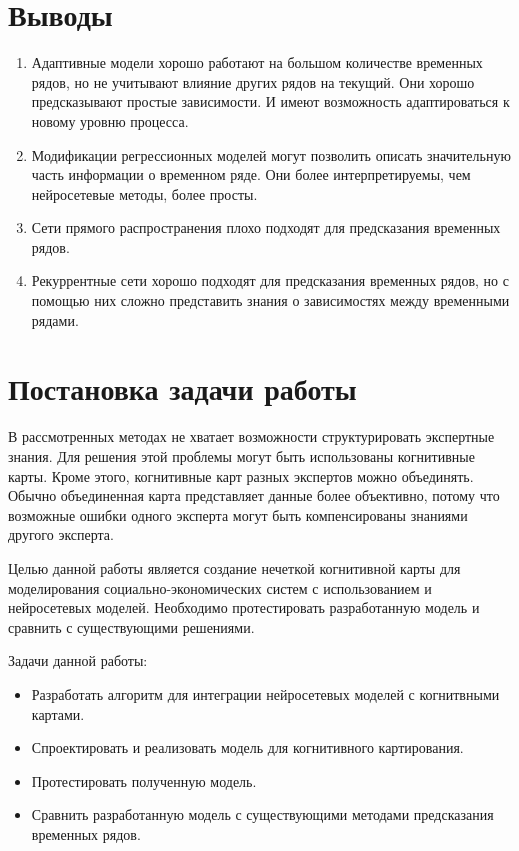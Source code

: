 \section{Выводы}

\begin{enumerate}
	\item Адаптивные модели хорошо работают на большом количестве временных рядов,
	но не учитывают влияние других рядов на текущий. Они хорошо предсказывают простые зависимости.
	И имеют возможность адаптироваться к новому уровню процесса.
	\item Модификации регрессионных моделей могут позволить описать значительную
	часть информации о временном ряде. Они более интерпретируемы, чем нейросетевые методы, более просты.
	\item Сети прямого распространения плохо подходят для предсказания временных рядов.
	\item Рекуррентные сети хорошо подходят для предсказания временных рядов, но
	с помощью них сложно представить знания о зависимостях между временными рядами.
\end{enumerate}


\section{Постановка задачи работы}


В рассмотренных методах не хватает возможности структурировать экспертные знания.
Для решения этой проблемы могут быть использованы когнитивные карты.
Кроме этого, когнитивные карт разных экспертов можно объединять. Обычно
объединенная карта представляет данные более объективно, потому что возможные
ошибки одного эксперта могут быть компенсированы знаниями другого эксперта.

Целью данной работы является создание нечеткой когнитивной карты для моделирования
социально-экономических систем с использованием и нейросетевых моделей.
Необходимо протестировать разработанную модель и сравнить с существующими решениями.

Задачи данной работы:
\begin{itemize}
	\item Разработать алгоритм для интеграции нейросетевых моделей с когнитвными картами.
	\item Спроектировать и реализовать модель для когнитивного картирования.
	\item Протестировать полученную модель.
	\item Сравнить разработанную модель с существующими методами предсказания временных рядов.
\end{itemize}

